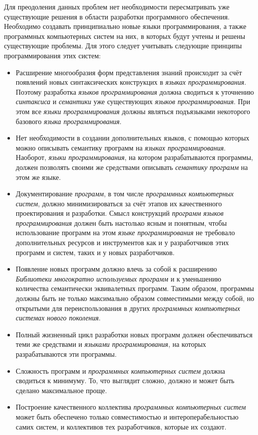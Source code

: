 Для преодоления данных проблем нет необходимости пересматривать уже существующие решения в области разработки программного обеспечения. Необходимо создавать принципиально новые языки программирования, а также программных компьютерных систем на них, в которых будут учтены и решены существующие проблемы. Для этого следует учитывать следующие принципы программирования этих систем:
\begin{itemize}
	\item Расширение многообразия форм представления знаний происходит за счёт появлений новых синтаксических конструкцих в \textit{языках программирования}. Поэтому разработка \textit{языков программирования} должна сводиться к уточнению \textit{синтаксиса} и \textit{семантики} уже существующих \textit{языков программирования}. При этом все \textit{языки программирования} должны являться подъязыками некоторого базового \textit{языка программирования}.
	\item Нет необходимости в создании дополнительных языков, с помощью которых можно описывать семантику программ на \textit{языках программирования}. Наоборот, \textit{языки программирования}, на котором разрабатываются программы, должен позволять своими же средствами описывать \textit{семантику} \textit{программ} на этом же языке.
	\item Документирование \textit{программ}, в том числе \textit{программных компьютерных систем}, должно минимизироваться за счёт этапов их качественного проектирования и разработки. Смысл конструкций \textit{программ} \textit{языков программирования} должен быть настолько ясным и понятным, чтобы использование программ на этом \textit{языке программирования} не требовало дополнительных ресурсов и инструментов как и у разработчиков этих программ и систем, таких и у новых разработчиков.
	\item Появление новых программ должно влечь за собой к расширению \textit{Библиотеки многократно используемых программ} и к уменьшению количества семантически эквивалетных программ. Таким образом, программы должны быть не только максимально образом совместимыми между собой, но открытыми для переиспользования в других \textit{программных компьютерных системах нового поколения}.
	\item Полный жизненный цикл разработки новых программ должен обеспечиваться теми же средствами и \textit{языками программирования}, на которых разрабатываются эти программы.
	\item Сложность программ и \textit{программных компьютерных систем} должна сводиться к минимуму. То, что выглядит сложно, должно и может быть сделано максимальное проще. 
	\item Построение качественного коллектива \textit{программных компьютерных систем} может быть обеспечено только совместимостью и интероперабельностью самих систем, и коллективов тех разработчиков, которые их создают.
\end{itemize}

